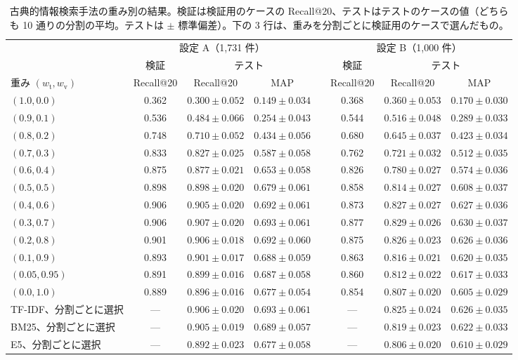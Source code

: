 \documentclass[11pt,a4paper]{ltjsarticle}
\begin{document}
\begin{table}[h]\centering
\caption{古典的情報検索手法の重み別の結果。検証は検証用のケースの Recall@20、テストはテストのケースの値（どちらも 10 通りの分割の平均。テストは $\pm$ 標準偏差）。下の 3 行は、重みを分割ごとに検証用のケースで選んだもの。}
\label{tab:weights}
\scriptsize
\setlength{\tabcolsep}{2.5pt}
\begin{tabular}{@{}lccccccc@{}}
\toprule
 & \multicolumn{3}{c}{設定 A（1{,}731 件）} & & \multicolumn{3}{c}{設定 B（1{,}000 件）} \\
\cmidrule{2-4}\cmidrule{6-8}
 & 検証 & \multicolumn{2}{c}{テスト} & & 検証 & \multicolumn{2}{c}{テスト} \\
\cmidrule{3-4}\cmidrule{7-8}
重み $(w_{\mathrm{t}}, w_{\mathrm{v}})$ & Recall@20 & Recall@20 & MAP & & Recall@20 & Recall@20 & MAP \\
\midrule
$(1.0, 0.0)$ & 0.362 & $0.300 \pm 0.052$ & $0.149 \pm 0.034$ & & 0.368 & $0.360 \pm 0.053$ & $0.170 \pm 0.030$ \\
$(0.9, 0.1)$ & 0.536 & $0.484 \pm 0.066$ & $0.254 \pm 0.043$ & & 0.544 & $0.516 \pm 0.048$ & $0.289 \pm 0.033$ \\
$(0.8, 0.2)$ & 0.748 & $0.710 \pm 0.052$ & $0.434 \pm 0.056$ & & 0.680 & $0.645 \pm 0.037$ & $0.423 \pm 0.034$ \\
$(0.7, 0.3)$ & 0.833 & $0.827 \pm 0.025$ & $0.587 \pm 0.058$ & & 0.762 & $0.721 \pm 0.032$ & $0.512 \pm 0.035$ \\
$(0.6, 0.4)$ & 0.875 & $0.877 \pm 0.021$ & $0.653 \pm 0.058$ & & 0.826 & $0.780 \pm 0.027$ & $0.574 \pm 0.036$ \\
$(0.5, 0.5)$ & 0.898 & $0.898 \pm 0.020$ & $0.679 \pm 0.061$ & & 0.858 & $0.814 \pm 0.027$ & $0.608 \pm 0.037$ \\
$(0.4, 0.6)$ & 0.906 & $0.905 \pm 0.020$ & $0.692 \pm 0.061$ & & 0.873 & $0.827 \pm 0.027$ & $0.627 \pm 0.036$ \\
$(0.3, 0.7)$ & 0.906 & $0.907 \pm 0.020$ & $0.693 \pm 0.061$ & & 0.877 & $0.829 \pm 0.026$ & $0.630 \pm 0.037$ \\
$(0.2, 0.8)$ & 0.901 & $0.906 \pm 0.018$ & $0.692 \pm 0.060$ & & 0.875 & $0.826 \pm 0.023$ & $0.626 \pm 0.036$ \\
$(0.1, 0.9)$ & 0.893 & $0.901 \pm 0.017$ & $0.688 \pm 0.059$ & & 0.863 & $0.816 \pm 0.021$ & $0.620 \pm 0.035$ \\
$(0.05, 0.95)$ & 0.891 & $0.899 \pm 0.016$ & $0.687 \pm 0.058$ & & 0.860 & $0.812 \pm 0.022$ & $0.617 \pm 0.033$ \\
$(0.0, 1.0)$ & 0.889 & $0.896 \pm 0.016$ & $0.677 \pm 0.054$ & & 0.854 & $0.807 \pm 0.020$ & $0.605 \pm 0.029$ \\
\midrule
TF-IDF、分割ごとに選択 & --- & $0.906 \pm 0.020$ & $0.693 \pm 0.061$ & & --- & $0.825 \pm 0.024$ & $0.626 \pm 0.035$ \\
BM25、分割ごとに選択 & --- & $0.905 \pm 0.019$ & $0.689 \pm 0.057$ & & --- & $0.819 \pm 0.023$ & $0.622 \pm 0.033$ \\
E5、分割ごとに選択 & --- & $0.892 \pm 0.023$ & $0.677 \pm 0.058$ & & --- & $0.806 \pm 0.020$ & $0.610 \pm 0.029$ \\
\bottomrule
\end{tabular}
\end{table}
\end{document}
